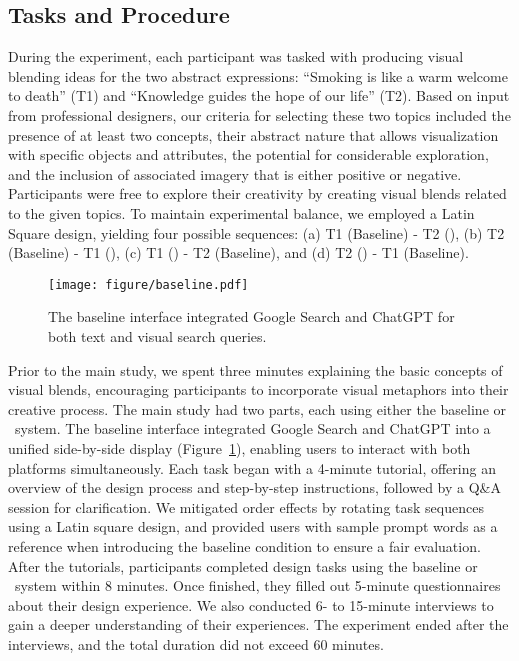 \subsection{Tasks and Procedure}



During the experiment, each participant was tasked with producing visual blending ideas for the two abstract expressions: ``Smoking is like a warm welcome to death'' (T1) and ``Knowledge guides the hope of our life'' (T2). 
Based on input from professional designers, our criteria for selecting these two topics included the presence of at least two concepts, their abstract nature that allows visualization with specific objects and attributes, the potential for considerable exploration, and the inclusion of associated imagery that is either positive or negative.
Participants were free to explore their creativity by creating visual blends related to the given topics.
To maintain experimental balance, we employed a Latin Square design, yielding four possible sequences: (a) T1 (Baseline) - T2 (\sysname), (b) T2 (Baseline) - T1 (\sysname), (c) T1 (\sysname) - T2 (Baseline), and (d) T2 (\sysname) - T1 (Baseline).


\begin{figure}[t]
  \centering
  \texttt{[image: figure/baseline.pdf]}
  \caption{The baseline interface integrated Google Search and ChatGPT for both text and visual search queries.
  }
  \label{fig:baseline}
\end{figure}






Prior to the main study, we spent three minutes explaining the basic concepts of visual blends, encouraging participants to incorporate visual metaphors into their creative process.
The main study had two parts, each using either the baseline or \sysname\ system. 
The baseline interface integrated Google Search and ChatGPT into a unified side-by-side display (Figure~\ref{fig:baseline}), enabling users to interact with both platforms simultaneously.
Each task began with a 4-minute tutorial, offering an overview of the design process and step-by-step instructions, followed by a Q\&A session for clarification. 
We mitigated order effects by rotating task sequences using a Latin square design, and provided users with sample prompt words as a reference when introducing the baseline condition to ensure a fair evaluation.
After the tutorials, participants completed design tasks using the baseline or \sysname\ system within 8 minutes.
Once finished, they filled out 5-minute questionnaires about their design experience.
We also conducted 6- to 15-minute interviews to gain a deeper understanding of their experiences.
The experiment ended after the interviews, and the total duration did not exceed 60 minutes.



